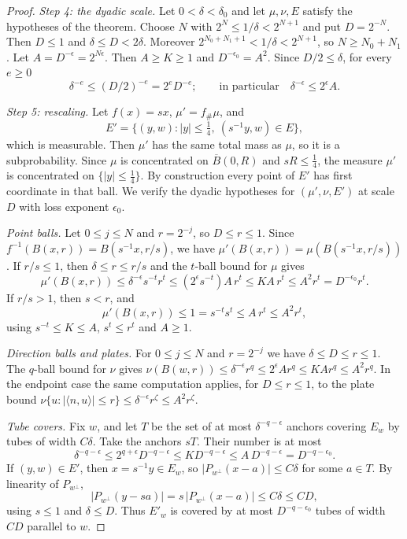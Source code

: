 \begin{proof}
\emph{Step 4: the dyadic scale.} Let $0<\delta<\delta_0$ and let $\mu,\nu,E$ satisfy the hypotheses of the theorem. Choose $N$ with $2^N\le1/\delta<2^{N+1}$ and put $D=2^{-N}$. Then $D\le1$ and $\delta\le D<2\delta$. Moreover $2^{N_0+N_1+1}<1/\delta<2^{N+1}$, so $N\ge N_0+N_1$. Let $A=D^{-\epsilon}=2^{N\epsilon}$. Then $A\ge K\ge1$ and $D^{-\epsilon_0}=A^2$. Since $D/2\le\delta$, for every $e\ge0$
\[
 \delta^{-e}\le (D/2)^{-e}=2^{e}D^{-e};\qquad\text{in particular}\quad \delta^{-\epsilon}\le 2^\epsilon A .
\]

\emph{Step 5: rescaling.} Let $f(x)=sx$, $\mu'=f_\#\mu$, and
\[
 E'=\{(y,w):|y|\le\tfrac14,\ (s^{-1}y,w)\in E\},
\]
which is measurable. Then $\mu'$ has the same total mass as $\mu$, so it is a subprobability. Since $\mu$ is concentrated on $\overline B(0,R)$ and $sR\le\frac14$, the measure $\mu'$ is concentrated on $\{|y|\le\frac14\}$. By construction every point of $E'$ has first coordinate in that ball. We verify the dyadic hypotheses for $(\mu',\nu,E')$ at scale $D$ with loss exponent $\epsilon_0$.

\emph{Point balls.} Let $0\le j\le N$ and $r=2^{-j}$, so $D\le r\le1$. Since $f^{-1}(B(x,r))=B(s^{-1}x,r/s)$, we have $\mu'(B(x,r))=\mu(B(s^{-1}x,r/s))$. If $r/s\le1$, then $\delta\le r\le r/s$ and the $t$-ball bound for $\mu$ gives
\[
 \mu'(B(x,r))\le\delta^{-\epsilon}s^{-t}r^t\le(2^\epsilon s^{-t})A\,r^t\le KA\,r^t\le A^2r^t=D^{-\epsilon_0}r^t .
\]
If $r/s>1$, then $s<r$, and
\[
 \mu'(B(x,r))\le1=s^{-t}s^t\le A\,r^t\le A^2r^t ,
\]
using $s^{-t}\le K\le A$, $s^t\le r^t$ and $A\ge1$.

\emph{Direction balls and plates.} For $0\le j\le N$ and $r=2^{-j}$ we have $\delta\le D\le r\le1$. The $q$-ball bound for $\nu$ gives $\nu(B(w,r))\le\delta^{-\epsilon}r^q\le 2^\epsilon A r^q\le KAr^q\le A^2r^q$. In the endpoint case the same computation applies, for $D\le r\le1$, to the plate bound $\nu\{u:|\langle n,u\rangle|\le r\}\le\delta^{-\epsilon}r^\zeta\le A^2r^\zeta$.

\emph{Tube covers.} Fix $w$, and let $T$ be the set of at most $\delta^{-q-\epsilon}$ anchors covering $E_w$ by tubes of width $C\delta$. Take the anchors $sT$. Their number is at most
\[
 \delta^{-q-\epsilon}\le 2^{q+\epsilon}D^{-q-\epsilon}\le K D^{-q-\epsilon}\le A\,D^{-q-\epsilon}=D^{-q-\epsilon_0}.
\]
If $(y,w)\in E'$, then $x=s^{-1}y\in E_w$, so $|P_{w^\perp}(x-a)|\le C\delta$ for some $a\in T$. By linearity of $P_{w^\perp}$,
\[
 |P_{w^\perp}(y-sa)|=s\,|P_{w^\perp}(x-a)|\le C\delta\le CD,
\]
using $s\le1$ and $\delta\le D$. Thus $E'_w$ is covered by at most $D^{-q-\epsilon_0}$ tubes of width $CD$ parallel to $w$.


\end{proof}
